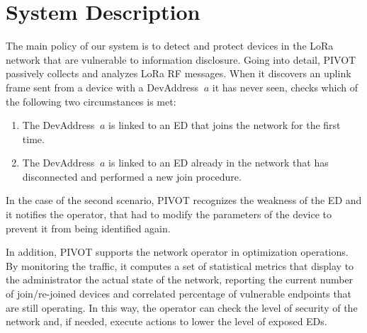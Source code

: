 \section{System Description}
\label{system}
The main policy of our system is to detect and protect devices in the LoRa network that are vulnerable to information disclosure. Going into detail, PIVOT passively collects and analyzes LoRa RF messages. When it discovers an uplink frame sent from a device with a DevAddress \(\ a \) it has never seen, checks which of the following two circumstances is met:
\begin{enumerate}
	\item The DevAddress \(\ a \) is linked to an ED that joins the network for the first time.
	\item The DevAddress \(\ a \) is linked to an ED already in the network that has disconnected and performed a new join procedure.
\end{enumerate}
In the case of the second scenario, PIVOT recognizes the weakness of the ED and it notifies the operator, that had to modify the parameters of the device to prevent it from being identified again.

\vspace{5mm} %

In addition, PIVOT supports the network operator in optimization operations. By monitoring the traffic, it computes a set of statistical metrics that display to the administrator the actual state of the network, reporting the current number of join/re-joined devices and correlated percentage of vulnerable endpoints that are still operating. In this way, the operator can check the level of security of the network and, if needed, execute actions to lower the level of exposed EDs.

\vspace{5mm} %


